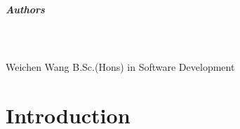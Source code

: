 \paragraph{Authors}
\\ \\ Weichen Wang B.Sc.(Hons) in Software Development


\chapter{Introduction}

